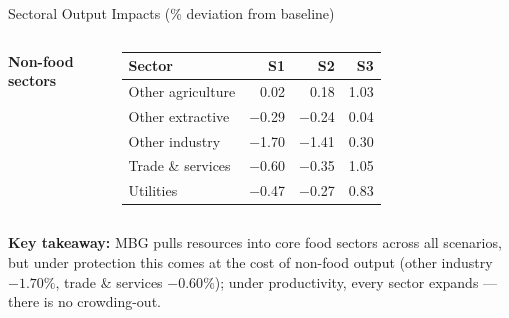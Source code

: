 \documentclass[11pt,aspectratio=169]{beamer}
\begin{document}
\begin{frame}{Sectoral Output Impacts (\% deviation from baseline)}
\begin{columns}[T,onlytextwidth]
	\centering\textbf{Non-food sectors}\\[3pt]
	\begin{tabular}{lrrr}
		\toprule
		\textbf{Sector} & \textbf{S1} & \textbf{S2} & \textbf{S3} \\
		\midrule
		Other agriculture   &   0.02 &   0.18 &   1.03 \\
		Other extractive    & $-$0.29 & $-$0.24 &   0.04 \\
		\rowcolor{lubrown10} Other industry      & $-$1.70 & $-$1.41 &   0.30 \\
		\rowcolor{lubrown10} Trade \& services   & $-$0.60 & $-$0.35 &   1.05 \\
		Utilities           & $-$0.47 & $-$0.27 &   0.83 \\
		\bottomrule
	\end{tabular}
\end{columns}
\medskip
{\scriptsize\textcolor{lubrown}{\textbf{Key takeaway:}} MBG pulls resources into core food sectors across all scenarios, but under protection this comes at the cost of non-food output (other industry $-1.70\%$, trade \& services $-0.60\%$); under productivity, every sector expands --- there is no crowding-out.}
\end{frame}
\end{document}
